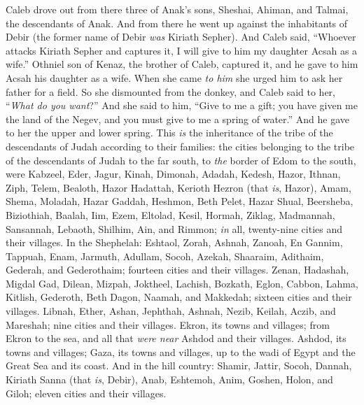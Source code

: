 \begin{biblechapter}
\verse Caleb drove out from there three of Anak’s sons, Sheshai, Ahiman, and Talmai, the descendants of Anak.
\verse And from there he went up against the inhabitants of Debir (the former name of Debir \textit{was} Kiriath Sepher).
\verse And Caleb said, “Whoever attacks Kiriath Sepher and captures it, I will give to him my daughter Acsah as a wife.”
\verse Othniel son of Kenaz, the brother of Caleb, captured it, and he gave to him Acsah his daughter as a wife.
\verse When she came \textit{to him} she urged him to ask her father for a field. So she dismounted from the donkey, and Caleb said to her, “\textit{What do you want}?”
\verse And she said to him, “Give to me a gift; you have given me the land of the Negev, and you must give to me a spring of water.” And he gave to her the upper and lower spring.
 This \textit{is} the inheritance of the tribe of the descendants of Judah according to their families:
\verse the cities belonging to the tribe of the descendants of Judah to the far south, to \textit{the} border of Edom to the south, were Kabzeel, Eder, Jagur,
\verse Kinah, Dimonah, Adadah,
\verse Kedesh, Hazor, Ithnan,
\verse Ziph, Telem, Bealoth,
\verse Hazor Hadattah, Kerioth Hezron (that \textit{is}, Hazor),
\verse Amam, Shema, Moladah,
\verse Hazar Gaddah, Heshmon, Beth Pelet,
\verse Hazar Shual, Beersheba, Biziothiah,
\verse Baalah, Iim, Ezem,
\verse Eltolad, Kesil, Hormah,
\verse Ziklag, Madmannah, Sansannah,
\verse Lebaoth, Shilhim, Ain, and Rimmon; \textit{in} all, twenty-nine cities and their villages.
\verse In the Shephelah: Eshtaol, Zorah, Ashnah,
\verse Zanoah, En Gannim, Tappuah, Enam,
\verse Jarmuth, Adullam, Socoh, Azekah,
\verse Shaaraim, Adithaim, Gederah, and Gederothaim; fourteen cities and their villages.
\verse Zenan, Hadashah, Migdal Gad,
\verse Dilean, Mizpah, Joktheel,
\verse Lachish, Bozkath, Eglon,
\verse Cabbon, Lahma, Kitlish,
\verse Gederoth, Beth Dagon, Naamah, and Makkedah; sixteen cities and their villages.
\verse Libnah, Ether, Ashan,
\verse Jephthah, Ashnah, Nezib,
\verse Keilah, Aczib, and Mareshah; nine cities and their villages.
\verse Ekron, its towns and villages;
\verse from Ekron to the sea, and all that \textit{were near} Ashdod and their villages.
\verse Ashdod, its towns and villages; Gaza, its towns and villages, up to the wadi of Egypt and the Great Sea and its coast.
\verse And in the hill country: Shamir, Jattir, Socoh,
\verse Dannah, Kiriath Sanna (that \textit{is}, Debir),
\verse Anab, Eshtemoh, Anim,
\verse Goshen, Holon, and Giloh; eleven cities and their villages.

\end{biblechapter}
